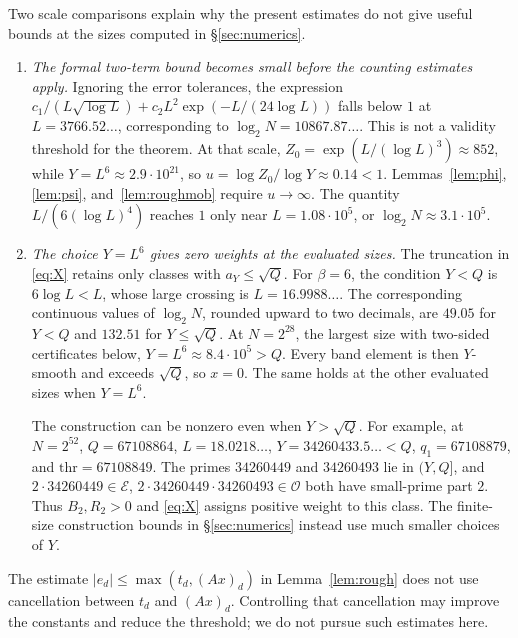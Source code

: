 \documentclass[11pt,a4paper]{article}
\theoremstyle{plain}
\theoremstyle{definition}
\theoremstyle{remark}
\newcommand{\thr}{\mathrm{thr}}
\newcommand{\vB}{\mathcal{E}}
\newcommand{\vR}{\mathcal{O}}
\begin{document}
Two scale comparisons explain why the present estimates do not give useful bounds at the sizes
computed in \S\ref{sec:numerics}.
\begin{enumerate}
\item \emph{The formal two-term bound becomes small before the counting estimates apply.}
Ignoring the error tolerances, the expression
$c_1/(L\sqrt{\log L})+c_2L^2\exp(-L/(24\log L))$ falls below $1$ at
$L=3766.52\ldots$, corresponding to $\log_2N=10867.87\ldots$.
This is not a validity threshold for the theorem. At that scale,
$Z_0=\exp(L/(\log L)^3)\approx852$, while $Y=L^6\approx2.9\cdot10^{21}$, so
$u=\log Z_0/\log Y\approx0.14<1$. Lemmas~\ref{lem:phi}, \ref{lem:psi}, and~\ref{lem:roughmob}
require $u\to\infty$. The quantity $L/(6(\log L)^4)$ reaches $1$ only near
$L=1.08\cdot10^5$, or $\log_2N\approx3.1\cdot10^5$.

\item \emph{The choice $Y=L^6$ gives zero weights at the evaluated sizes.}
The truncation in \eqref{eq:X} retains only classes with $a_Y\le\sqrt Q$.
For $\beta=6$, the condition $Y<Q$ is $6\log L<L$, whose large crossing is
$L=16.9988\ldots$. The corresponding continuous values of $\log_2N$, rounded upward to two decimals,
are $49.05$ for $Y<Q$ and $132.51$ for $Y\le\sqrt Q$.
At $N=2^{28}$, the largest size with two-sided certificates below,
$Y=L^6\approx8.4\cdot10^5>Q$. Every band element is then $Y$-smooth and exceeds $\sqrt Q$,
so $x=0$. The same holds at the other evaluated sizes when $Y=L^6$.

The construction can be nonzero even when $Y>\sqrt Q$. For example, at $N=2^{52}$,
$Q=67108864$, $L=18.0218\ldots$, $Y=34260433.5\ldots<Q$, $q_1=67108879$, and
$\thr=67108849$. The primes $34260449$ and $34260493$ lie in $(Y,Q]$, and
$2\cdot34260449\in\vB$, $2\cdot34260449\cdot34260493\in\vR$ both have small-prime part $2$.
Thus $B_2,R_2>0$ and \eqref{eq:X} assigns positive weight to this class.
The finite-size construction bounds in \S\ref{sec:numerics} instead use much smaller choices of $Y$.
\end{enumerate}

The estimate $|e_d|\le\max(t_d,(Ax)_d)$ in Lemma~\ref{lem:rough} does not use cancellation between
$t_d$ and $(Ax)_d$. Controlling that cancellation may improve the constants and reduce the threshold;
we do not pursue such estimates here.
\end{document}

